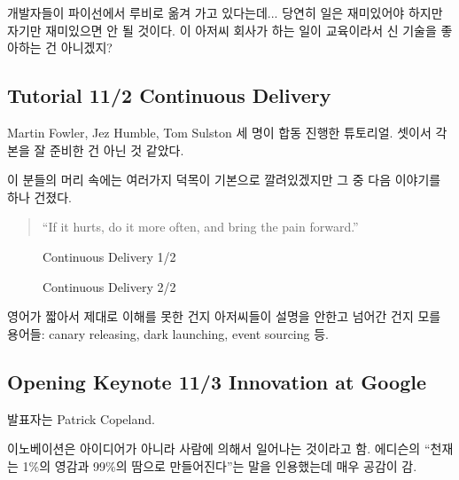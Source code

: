 \documentclass[a4paper]{article}
\begin{document}
개발자들이 파이선에서 루비로 옮겨 가고 있다는데... 당연히 일은
재미있어야 하지만 자기만 재미있으면 안 될 것이다. 이 아저씨 회사가 하는
일이 교육이라서 신 기술을 좋아하는 건 아니겠지?

\subsection{Tutorial 11/2 Continuous Delivery}

Martin Fowler, Jez Humble, Tom Sulston 세 명이 합동 진행한 튜토리얼.
셋이서 각본을 잘 준비한 건 아닌 것 같았다.

이 분들의 머리 속에는 여러가지 덕목이 기본으로 깔려있겠지만 그 중 다음
이야기를 하나 건졌다.

\begin{quote}
``If it hurts, do it more often, and bring the pain forward.''  
\end{quote}

\begin{figure}[t]
    \begin{Frame}
        \begin{center}
        \end{center}
    \end{Frame}
    \caption{Continuous Delivery 1/2}
    \label{Continuous Delivery 1}
\end{figure}

\begin{figure}[t]
    \begin{Frame}
        \begin{center}
        \end{center}
    \end{Frame}
    \caption{Continuous Delivery 2/2}
    \label{Continuous Delivery 2}
\end{figure}

영어가 짧아서 제대로 이해를 못한 건지 아저씨들이 설명을 안한고
넘어간 건지 모를 용어들: canary releasing, dark launching, event
sourcing 등.

\subsection{Opening Keynote 11/3 Innovation at Google}
 
발표자는 Patrick Copeland.
 
이노베이션은 아이디어가 아니라 사람에 의해서 일어나는 것이라고 함.
에디슨의 ``천재는 1\%의 영감과 99\%의 땀으로 만들어진다''는 말을
인용했는데 매우 공감이 감.
 
\end{document}
